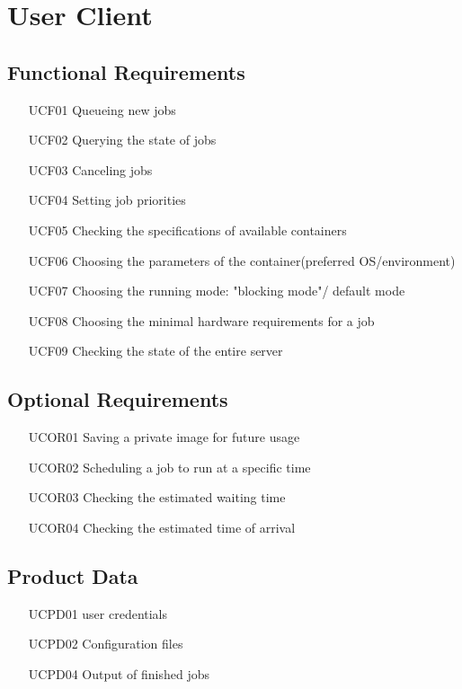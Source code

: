 \chapter{User Client}
  \section{Functional Requirements} 
  \begin{itemize}
    \item [UCF01] Queueing new jobs
    \item [UCF02] Querying the state of jobs
    \item [UCF03] Canceling jobs
    \item [UCF04] Setting job priorities 
    \item [UCF05] Checking the specifications of available containers
    \item [UCF06] Choosing the parameters of the container(preferred OS/environment)
    \item [UCF07] Choosing the running mode: "blocking mode"/ default mode
    \item [UCF08] Choosing the minimal hardware requirements for a job 
    \item [UCF09] Checking the state of the entire server
  \end{itemize}

  \section{Optional Requirements} 
  \begin{itemize}
    \item [UCOR01] Saving a private image for future usage
    \item [UCOR02] Scheduling a job to run at a specific time
    \item [UCOR03] Checking the estimated waiting time
    \item [UCOR04] Checking the estimated time of arrival
  \end{itemize}

  \section{Product Data} 
  \begin{itemize}
    \item [UCPD01] user credentials
    \item [UCPD02] Configuration files
    \item [UCPD04] Output of finished jobs
  \end{itemize}

